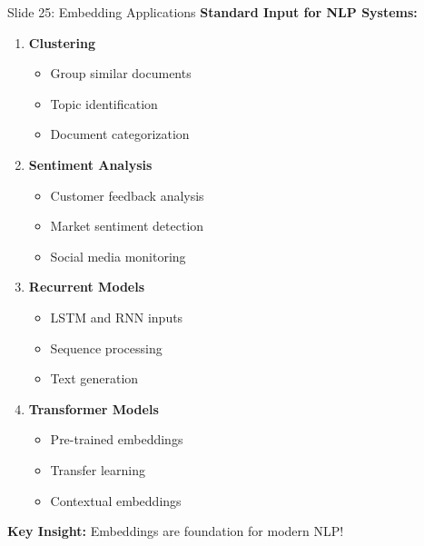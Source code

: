 \documentclass[8pt]{beamer}
\begin{document}
	\begin{frame}{Slide 25: Embedding Applications}
		\fontsize{6.5}{7.5}\selectfont
		\textbf{Standard Input for NLP Systems:}
		\begin{enumerate}
			\item \textbf{Clustering}
			\begin{itemize}
				\item Group similar documents
				\item Topic identification
				\item Document categorization
			\end{itemize}
			\item \textbf{Sentiment Analysis}
			\begin{itemize}
				\item Customer feedback analysis
				\item Market sentiment detection
				\item Social media monitoring
			\end{itemize}
			\item \textbf{Recurrent Models}
			\begin{itemize}
				\item LSTM and RNN inputs
				\item Sequence processing
				\item Text generation
			\end{itemize}
			\item \textbf{Transformer Models}
			\begin{itemize}
				\item Pre-trained embeddings
				\item Transfer learning
				\item Contextual embeddings
			\end{itemize}
		\end{enumerate}
		
		\textcolor{myblue}{\textbf{Key Insight:}} Embeddings are foundation for modern NLP!
	\end{frame}
	
	
\end{document}
